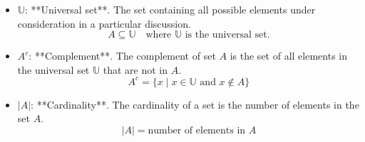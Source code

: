\documentclass{article}
\begin{document}
\begin{itemize}
    \[
    A \triangle B = (A \setminus B) \cup (B \setminus A)
    \]
    \item \(\mathbb{U}\): **Universal set**. The set containing all possible elements under consideration in a particular discussion.
    \[
    A \subseteq \mathbb{U} \quad \text{where } \mathbb{U} \text{ is the universal set.}
    \]
    \item \(A^c\): **Complement**. The complement of set \( A \) is the set of all elements in the universal set \( \mathbb{U} \) that are not in \( A \).
    \[
    A^c = \{x \mid x \in \mathbb{U} \text{ and } x \notin A\}
    \]
    \item \(|A|\): **Cardinality**. The cardinality of a set is the number of elements in the set \( A \).
    \[
    |A| = \text{number of elements in } A
    \]
\end{itemize}
\end{document}
